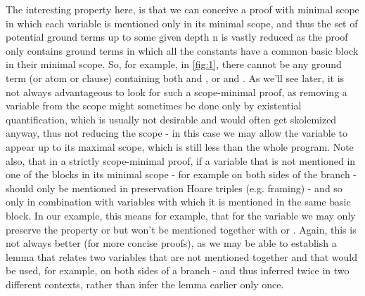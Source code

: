 	The interesting property here, is that we can conceive a proof with minimal scope in which each variable is mentioned only in its minimal scope, and thus the set of potential ground terms up to some given depth n is vastly reduced as the proof only contains ground terms in which all the constants have a common basic block in their minimal scope.
	So, for example, in \ref{fig:1}, there cannot be any ground term (or atom or clause) containing both  and , or  and .
	As we'll see later, it is not always advantageous to look for such a scope-minimal proof, as removing a variable from the scope might sometimes be done only by existential quantification, which is usually not desirable and would often get skolemized anyway, thus not reducing the scope - in this case we may allow the variable to appear up to its maximal scope, which is still less than the whole program.
	Note also, that in a strictly scope-minimal proof, if a variable that is not mentioned in one of the blocks in its minimal scope - for example  on both sides of the branch - should only be mentioned in preservation Hoare triples (e.g. framing) - and so only in combination with variables with which it is mentioned in the same basic block.
	In our example, this means for example, that for the variable  we may only preserve the property  or  but won't be mentioned together with  or .
	Again, this is not always better (for more concise proofs), as we may be able to establish a lemma that relates two variables that are not mentioned together and that would be used, for example, on both sides of a branch - and thus inferred twice in two different contexts, rather than infer the lemma earlier only once.



